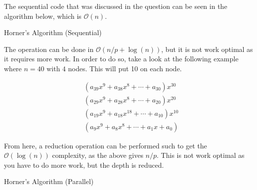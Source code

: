 \documentclass[addpoints]{exam}
\newcommand{\BigO}[1]{\mathcal{O}\left( #1\right)}
\begin{document}
\begin{questions}
\begin{solution}
The sequential code that was discussed in the question can be seen in the algorithm below, which is $\BigO{n}$.
\begin{algorithm}[H]
\caption{Horner's Algorithm (Sequential)}
\begin{algorithmic}[1]
\ENDFOR
{}
\end{algorithmic}
\end{algorithm}

The operation can be done in $\BigO{n/p + \log(n)}$, but it is not work optimal as it requires more work. In order to do so, take a look at the following example where $n = 40$ with $4$ nodes. This will put 10 on each node.

\begin{align*}
&\left(a_{39}x^{9}+a_{38}x^{8}+\cdots + a_{30}\right)x^{30}\\
&\left(a_{29}x^{9}+a_{28}x^{8}+\cdots + a_{20}\right)x^{20}\\
&\left(a_{19}x^{9}+a_{18}x^{18}+\cdots + a_{10}\right)x^{10}\\
&\left(a_{9}x^{9}+a_{8}x^{8} + \cdots + a_{1}x + a_{0}\right)
\end{align*}

From here, a reduction operation can be performed such to get the $\BigO{\log(n)}$ complexity, as the above gives $n/p$. This is not work optimal as you have to do more work, but the depth is reduced.

\begin{algorithm}[H]
\caption{Horner's Algorithm (Parallel)}
\begin{algorithmic}[1]
\ELSE
{}
\ENDIF
{}
\end{algorithmic}
\end{algorithm}
\end{solution}

\end{questions}
\end{document}
